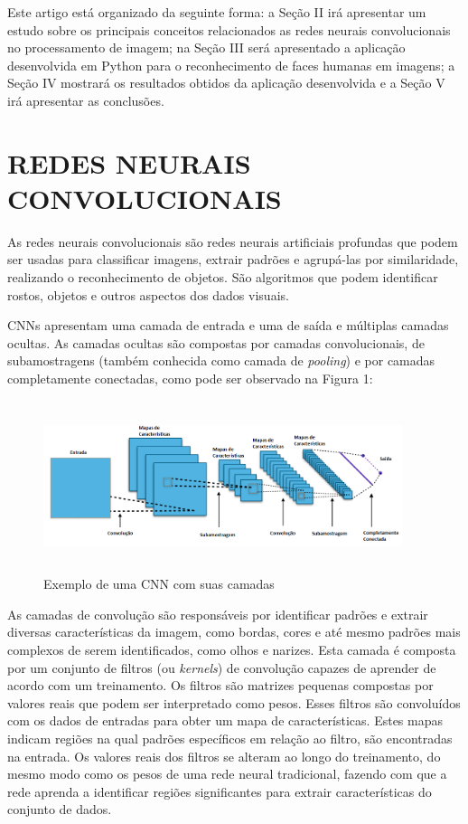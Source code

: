 \documentclass[conference]{IEEEtran}
\begin{document}
		Este artigo está organizado da seguinte forma: a Seção II irá apresentar um estudo sobre os principais conceitos relacionados as redes neurais convolucionais no processamento de imagem; na Seção III será apresentado a aplicação desenvolvida em Python para o reconhecimento de faces humanas em imagens; a Seção IV mostrará os resultados obtidos da aplicação desenvolvida e a Seção V irá apresentar as conclusões.   
		
	 \section{REDES NEURAIS CONVOLUCIONAIS}
		As redes neurais convolucionais são redes neurais artificiais profundas que podem ser usadas para classificar imagens, extrair padrões e agrupá-las por similaridade, realizando o reconhecimento de objetos. São algoritmos que podem identificar rostos, objetos e outros aspectos dos dados visuais.

        CNNs apresentam uma camada de entrada e uma de saída e múltiplas camadas ocultas. As camadas ocultas são compostas por camadas convolucionais, de subamostragens (também conhecida como camada de \textit{pooling}) e por camadas completamente conectadas, como pode ser observado na Figura 1:
        
		\begin{figure}[h!b]
			\centering \includegraphics[width=10.5cm,height=5cm]{CNN}
			\caption{Exemplo de uma CNN com suas camadas} 
		\end{figure}
		
		As camadas de convolução são responsáveis por identificar padrões e extrair diversas características da imagem, como bordas, cores e até mesmo padrões mais complexos de serem identificados, como olhos e narizes.  Esta camada é composta por um conjunto de filtros (ou \textit{kernels}) de convolução capazes de aprender de acordo com um treinamento. Os filtros são matrizes pequenas compostas por valores reais que podem ser interpretado como pesos. Esses filtros são convoluídos com os dados de entradas para obter um mapa de características. Estes mapas indicam regiões na qual padrões específicos em relação ao filtro, são encontradas na entrada. Os valores reais dos filtros se alteram ao longo do treinamento, do mesmo modo como os pesos de uma rede neural tradicional, fazendo com que a rede aprenda a identificar regiões significantes para extrair características do conjunto de dados.
		
\end{document}

